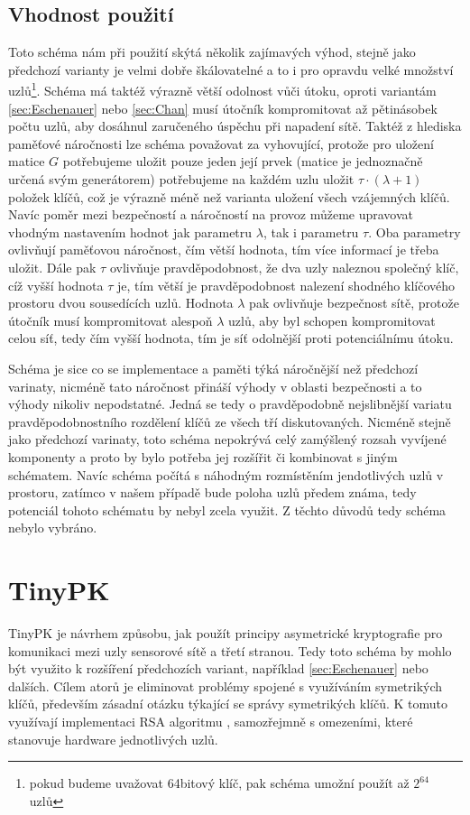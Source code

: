 \documentclass[11pt,final,twoside]{fithesis2}
\begin{document}
\subsection{Vhodnost použití}
Toto schéma nám při použití skýtá několik zajímavých výhod, stejně jako předchozí varianty je velmi dobře škálovatelné a to i pro opravdu velké množství uzlů\footnote{pokud budeme uvažovat 64bitový klíč, 
pak schéma umožní použít až $2^{64}$ uzlů}. Schéma má taktéž výrazně větší odolnost vůči útoku, oproti variantám \ref{sec:Eschenauer} nebo \ref{sec:Chan} musí útočník kompromitovat až pětinásobek počtu uzlů, 
aby dosáhnul zaručeného úspěchu při napadení sítě. Taktéž z hlediska paměťové náročnosti lze schéma považovat za vyhovující, protože pro uložení matice $G$ potřebujeme uložit pouze jeden její prvek 
(matice je jednoznačně určená svým generátorem) potřebujeme na každém uzlu uložit $\tau \cdot (\lambda +1)$ položek klíčů, což je výrazně méně než varianta uložení všech vzájemných klíčů. Navíc 
poměr mezi bezpečností a náročností na provoz můžeme upravovat vhodným nastavením hodnot jak parametru $\lambda$, tak i parametru $\tau$. Oba parametry ovlivňují paměťovou náročnost, čím větší hodnota, tím 
více informací je třeba uložit. Dále pak $\tau$ ovlivňuje pravděpodobnost, že dva uzly naleznou společný klíč, cíž vyšší hodnota $\tau$ je, tím větší je pravděpodobnost nalezení shodného klíčového prostoru
dvou sousedících uzlů. Hodnota $\lambda$ pak ovlivňuje bezpečnost sítě, protože útočník musí kompromitovat alespoň $\lambda$ uzlů, aby byl schopen kompromitovat celou síť, tedy čím vyšší hodnota, tím 
je síť odolnější proti potenciálnímu útoku.

Schéma je sice co se implementace a paměti týká náročnější než předchozí varinaty, nicméně tato náročnost přináší výhody v oblasti bezpečnosti a to výhody nikoliv 
nepodstatné. Jedná se tedy o pravděpodobně nejslibnější variatu pravděpodobnostního rozdělení klíčů ze všech tří diskutovaných. Nicméně stejně jako předchozí varinaty, toto schéma nepokrývá celý 
zamýšlený rozsah vyvíjené komponenty a proto by bylo potřeba jej rozšířit či kombinovat s jiným schématem. Navíc schéma počítá s náhodným rozmístěním jendotlivých uzlů v prostoru, zatímco v našem případě 
bude poloha uzlů předem známa, tedy potenciál tohoto schématu by nebyl zcela využit. Z těchto důvodů tedy schéma nebylo vybráno.

\section{TinyPK}
TinyPK \cite{Watro2004} je návrhem způsobu, jak použít principy asymetrické kryptografie 
pro komunikaci mezi uzly sensorové sítě a třetí stranou. Tedy toto schéma by mohlo být využito k rozšíření předchozích variant, například \ref{sec:Eschenauer}
nebo dalších. Cílem atorů je eliminovat problémy spojené s využíváním 
symetrikých klíčů, především zásadní otázku týkající se správy symetrikých klíčů. K tomuto využívají
implementaci RSA algoritmu \cite{Rivest1978}, samozřejmně s omezeními, které stanovuje hardware jednotlivých uzlů.
\end{document}
